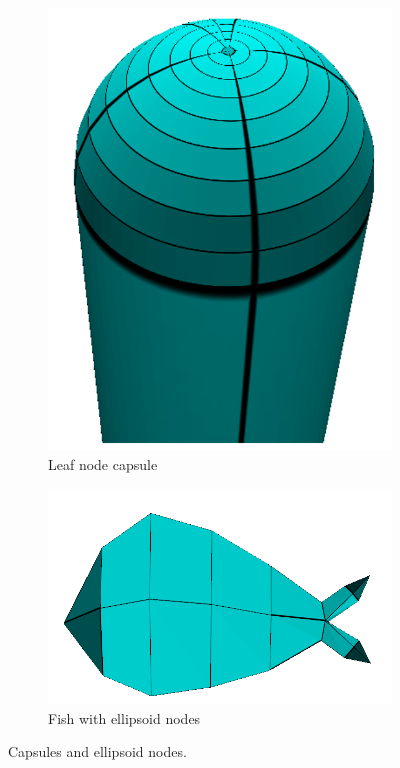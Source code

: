 \begin{figure}[h]
        \centering
        \begin{subfigure}[b]{0.25\textwidth}
                \includegraphics[height=\textwidth]{images/capsule.png}
                \caption{Leaf node capsule}
                \label{fig:caps}
        \end{subfigure}%
        \qquad %
        \begin{subfigure}[b]{0.4\textwidth}
                \includegraphics[width=\textwidth]{images/ryba_mesh.png}
                \caption{Fish with ellipsoid nodes}
                \label{fig:fish}
        \end{subfigure}
        \caption[Capsules and ellipsoid nodes]{Capsules and ellipsoid nodes.}\label{fig:caps_ell}
\end{figure}

